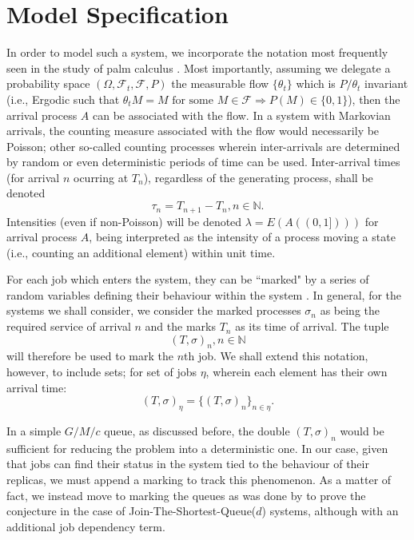 
\chapter{Model Specification}\label{ch:model-specification}

In order to model such a system, we incorporate the notation most frequently seen in the
study of palm calculus \cite{baccelli_elements_2003}. Most importantly, assuming we delegate a probability space $(\Omega, \mathcal{F}_{t}, \mathcal{F}, P)$ the measurable flow $\{\theta_{t}\}$ which is $P/\theta_{t}$ invariant (i.e., Ergodic such that $\theta_{t}M = M \text{  for some } M \in \mathcal{F} \Rightarrow P(M) \in \{0,1\}$), then the arrival process $A$ can be associated with the flow.
In a system with Markovian arrivals, the counting measure associated with the flow would necessarily be Poisson;
other so-called counting processes wherein inter-arrivals are determined by random or even deterministic periods of time can be used. Inter-arrival times (for arrival $n$ ocurring at $T_{n}$), regardless of the generating process, shall be denoted
\[\tau_{n} = T_{n+1}  - T_{n}, n \in \mathbb{N}.\]
Intensities (even if non-Poisson) will be denoted $\lambda = E(A((0,1])))$ for arrival process $A$, being interpreted as the intensity of a process moving a state (i.e., counting an additional element) within unit time.
\begin{definition}
    For each job which enters the system, they can be ``marked" by a series of random variables defining their behaviour within the system \cite{baccelli_elements_2003}. In general, for the systems we shall consider, we consider the marked processes $\sigma_{n}$ as being the required service of arrival $n$ and the marks $T_{n}$ as its time of arrival.
    The tuple \[(T,\sigma)_{n}, n \in \mathbb{N}\] will therefore be used to mark the $n$th job.
    We shall extend this notation, however, to include sets;
    for set of jobs $\eta$, wherein each element has their own arrival time:
    \[(T, \sigma)_{\eta} = \{(T,\sigma)_{n}\}_{n \in \eta}.\]
\end{definition}

In a simple $G/M/c$ queue, as discussed before, the double $(T,\sigma)_{n}$ would be sufficient for reducing the problem into a deterministic one.
In our case, given that jobs can find their status in the system tied to the behaviour of their replicas, we must append a marking to track this phenomenon.
As a matter of fact, we instead move to marking the queues as was done by \cite{bramson_asymptotic_2012} to prove the conjecture in the case of Join-The-Shortest-Queue($d$) systems, although with an additional job dependency term.

